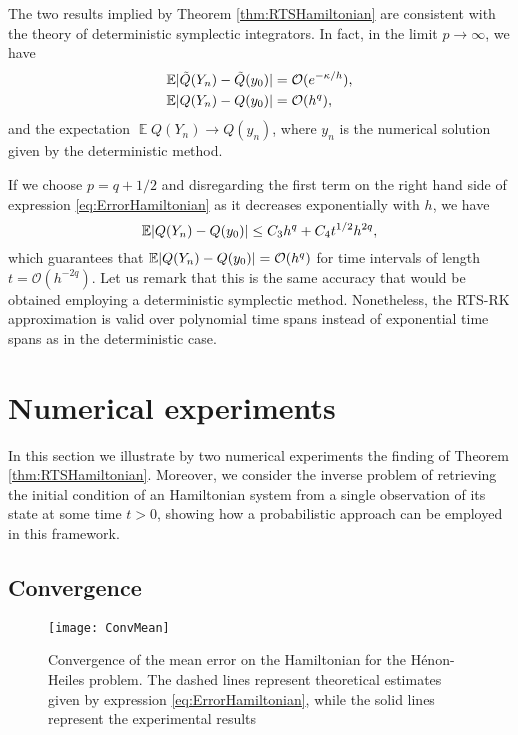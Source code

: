 \documentclass{siamart1116}
\numberwithin{theorem}{section}
\DeclarePairedDelimiter{\abs}{\lvert}{\rvert}
\newcommand{\OO}{\mathcal{O}}
\newcommand{\E}{\operatorname{\mathbb{E}}}
\newcommand{\corr}[1]{{\color{red}#1}}
\begin{document}
\begin{remark} The two results implied by Theorem \ref{thm:RTSHamiltonian} are consistent with the theory of deterministic symplectic integrators. In fact, in the limit $p \to \infty$, we have
	\begin{align}
		\E \abs{\tilde Q(Y_n) - \tilde Q(y_0)} &= \OO(e^{-\kappa/h}), \\
		\E \abs{Q(Y_n) - Q(y_0)} &= \OO(h^q),
	\end{align}
	and the expectation $\E Q(Y_n) \to Q(y_n)$, where $y_n$ is the numerical solution given by the deterministic method.
\end{remark}
\begin{remark} \corr{If we choose} $p = q + 1/2$ and disregarding the first term \corr{on the right hand side of expression \eqref{eq:ErrorHamiltonian} as it} decreases exponentially with $h$, we have
\begin{equation}\label{eq:OptimalNoiseScale}
	\E\abs{Q(Y_n) - Q(y_0)} \leq C_3 h^q + C_4t^{1/2}h^{2q},
\end{equation} 
which guarantees that $\E\abs{Q(Y_n) - Q(y_0)} = \OO(h^q)$ for time intervals of length $t = \OO(h^{-2q})$. \corr{Let us remark that this is the same accuracy that would be obtained employing a deterministic symplectic method. Nonetheless, the RTS-RK approximation is valid over polynomial time spans instead of exponential time spans as in the deterministic case.}
\end{remark}

\section{Numerical experiments}\label{sec:NUMEXP}
In this section we \corr{illustrate by} two numerical experiments the \corr{finding} of Theorem \ref{thm:RTSHamiltonian}. Moreover, we consider the inverse problem of retrieving the initial condition of an Hamiltonian system from a single observation of its state at some time $t > 0$, showing how a probabilistic approach can be employed in this framework.

\subsection{Convergence} 
\begin{figure}[t!]
	\centering
	\texttt{[image: ConvMean]}
	\caption{Convergence of the mean error on the Hamiltonian for the Hénon-Heiles problem. \corr{The dashed lines represent theoretical estimates given by expression \eqref{eq:ErrorHamiltonian}, while the solid lines represent the experimental results}}
	\label{fig:Mean}	
\end{figure}
\end{document}
